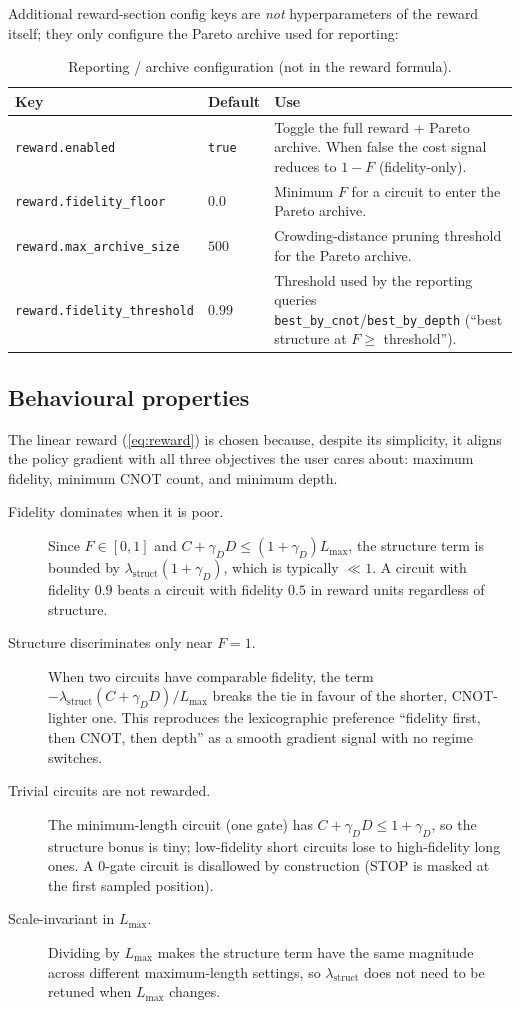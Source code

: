 \documentclass[11pt]{article}
\newcommand{\lammstruct}{\lambda_{\mathrm{struct}}}
\newcommand{\gammadepth}{\gamma_{D}}
\newcommand{\Lmax}{L_{\max}}
\begin{document}
Additional reward-section config keys are \emph{not} hyperparameters of the
reward itself; they only configure the Pareto archive used for reporting:

\begin{table}[h]
\centering
\begin{tabular}{llp{8cm}}
\toprule
Key & Default & Use \\
\midrule
\texttt{reward.enabled} & \texttt{true} & Toggle the full reward + Pareto
archive. When false the cost signal reduces to $1-F$ (fidelity-only). \\
\texttt{reward.fidelity\_floor} & $0.0$ & Minimum $F$ for a circuit to
enter the Pareto archive. \\
\texttt{reward.max\_archive\_size} & $500$ & Crowding-distance pruning
threshold for the Pareto archive. \\
\texttt{reward.fidelity\_threshold} & $0.99$ & Threshold used by the
reporting queries \texttt{best\_by\_cnot}/\texttt{best\_by\_depth}
(``best structure at $F\ge$ threshold''). \\
\bottomrule
\end{tabular}
\caption{Reporting / archive configuration (not in the reward formula).}
\end{table}

\subsection{Behavioural properties}

The linear reward (\ref{eq:reward}) is chosen because, despite its simplicity,
it aligns the policy gradient with all three objectives the user cares about:
maximum fidelity, minimum CNOT count, and minimum depth.

\begin{description}
  \item[Fidelity dominates when it is poor.] Since $F\in[0,1]$ and
  $C+\gammadepth D \le (1+\gammadepth)\Lmax$, the structure term is bounded
  by $\lammstruct(1+\gammadepth)$, which is typically $\ll 1$. A circuit
  with fidelity $0.9$ beats a circuit with fidelity $0.5$ in reward units
  regardless of structure.
  \item[Structure discriminates only near $F=1$.] When two circuits have
  comparable fidelity, the term $-\lammstruct(C+\gammadepth D)/\Lmax$ breaks
  the tie in favour of the shorter, CNOT-lighter one. This reproduces the
  lexicographic preference ``fidelity first, then CNOT, then depth'' as a
  smooth gradient signal with no regime switches.
  \item[Trivial circuits are not rewarded.] The minimum-length circuit
  (one gate) has $C+\gammadepth D \le 1+\gammadepth$, so the structure
  bonus is tiny; low-fidelity short circuits lose to high-fidelity long ones.
  A $0$-gate circuit is disallowed by construction (STOP is masked at the
  first sampled position).
  \item[Scale-invariant in $\Lmax$.] Dividing by $\Lmax$ makes the structure
  term have the same magnitude across different maximum-length settings,
  so $\lammstruct$ does not need to be retuned when $\Lmax$ changes.
\end{description}
\end{document}
